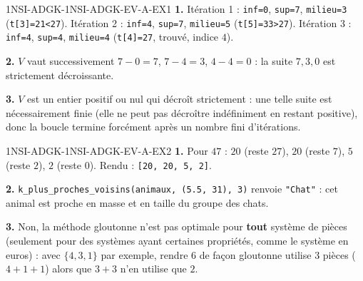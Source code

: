 \begin{corrige}{1NSI-ADGK-1NSI-ADGK-EV-A-EX1}
\textbf{1.} Itération 1 : \lstinline{inf=0}, \lstinline{sup=7}, \lstinline{milieu=3}
(\lstinline{t[3]=21<27}). Itération 2 : \lstinline{inf=4}, \lstinline{sup=7},
\lstinline{milieu=5} (\lstinline{t[5]=33>27}). Itération 3 : \lstinline{inf=4},
\lstinline{sup=4}, \lstinline{milieu=4} (\lstinline{t[4]=27}, trouvé, indice $4$).

\textbf{2.} $V$ vaut successivement $7-0=7$, $7-4=3$, $4-4=0$ : la suite $7,3,0$ est
strictement décroissante.

\textbf{3.} $V$ est un entier positif ou nul qui décroît strictement : une telle suite est
nécessairement finie (elle ne peut pas décroître indéfiniment en restant positive), donc
la boucle termine forcément après un nombre fini d'itérations.
\end{corrige}

\begin{corrige}{1NSI-ADGK-1NSI-ADGK-EV-A-EX2}
\textbf{1.} Pour $47$ : $20$ (reste $27$), $20$ (reste $7$), $5$ (reste $2$), $2$ (reste
$0$). Rendu : \lstinline{[20, 20, 5, 2]}.

\textbf{2.} \lstinline{k_plus_proches_voisins(animaux, (5.5, 31), 3)} renvoie
\lstinline{"Chat"} : cet animal est proche en masse et en taille du groupe des chats.

\textbf{3.} Non, la méthode gloutonne n'est pas optimale pour \textbf{tout} système de
pièces (seulement pour des systèmes ayant certaines propriétés, comme le système en euros) :
avec $\{4,3,1\}$ par exemple, rendre $6$ de façon gloutonne utilise $3$ pièces
($4+1+1$) alors que $3+3$ n'en utilise que $2$.
\end{corrige}
